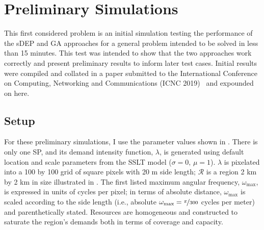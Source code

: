 \documentclass[12pt,dvipsnames]{report}
\begin{document}
\section{Preliminary Simulations} \label{sec:prelim}

This first considered problem is an initial simulation testing the performance of the sDEP and GA approaches for a general problem intended to be solved in less than 15 minutes.  This test was intended to show that the two approaches work correctly and present preliminary results to inform later test cases.  Initial results were compiled and collated in a paper submitted to the International Conference on Computing, Networking and Communications (ICNC 2019)~\cite{KTeague:BSSelection} and expounded on here.

\subsection{Setup} \label{subsec:prelim_setup}

For these preliminary simulations, I use the parameter values shown in .  There is only one SP, and its demand intensity function, $\lambda$, is generated using default location and scale parameters from the SSLT model ($\sigma = 0,\, \mu = 1$).  $\lambda$ is pixelated into a 100 by 100 grid of square pixels with 20 m side length; $\mathcal{R}$ is a region 2 km by 2 km in size illustrated in .  The first listed maximum angular frequency, $\omega_{\max}$, is expressed in units of cycles per pixel; in terms of absolute distance, $\omega_{\max}$ is scaled according to the side length (i.e., absolute $\omega_{\max} = \nicefrac{\pi}{300}$ cycles per meter) and parenthetically stated.  Resources are homogeneous and constructed to saturate the region's demands both in terms of coverage and capacity.
\end{document}
